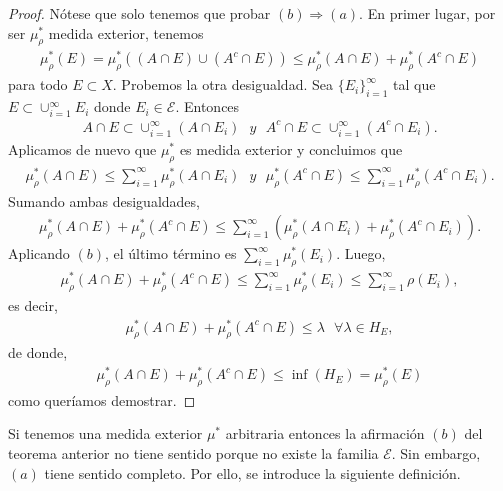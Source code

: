 \begin{proof}
Nótese que solo tenemos que probar $(b) \Longrightarrow (a)$. En primer lugar, por ser $\mu_{\rho}^*$ medida exterior, tenemos
\begin{align*}
    \mu_{\rho}^*(E) = \mu_{\rho}^*((A \cap E) \cup (A^c \cap E)) \leq \mu_{\rho}^*(A \cap E) + \mu_{\rho}^*(A^c \cap E)
\end{align*}
para todo $E \subset X$. Probemos la otra desigualdad. Sea $\{E_i\}_{i=1}^{\infty}$ tal que $E \subset \cup_{i=1}^{\infty}{E_i}$ donde $E_i \in \mathcal{E}$. Entonces
\begin{align*}
    A \cap E \subset \cup_{i=1}^{\infty}{(A \cap E_i)} \ \ \ y \ \ \ A^c \cap E \subset \cup_{i=1}^{\infty}{(A^c \cap E_i)}.
\end{align*}
Aplicamos de nuevo que $\mu_{\rho}^*$ es medida exterior y concluimos que
\begin{align*}
    \mu_{\rho}^*(A \cap E) \leq \sum_{i=1}^{\infty}{ \mu_{\rho}^*(A \cap E_i)} \ \ \ y \ \ \ \mu_{\rho}^*(A^c \cap E) \leq \sum_{i=1}^{\infty}{ \mu_{\rho}^*(A^c \cap E_i)}.
\end{align*}
Sumando ambas desigualdades,
\begin{align*}
    \mu_{\rho}^*(A \cap E) + \mu_{\rho}^*(A^c \cap E) \leq \sum_{i=1}^{\infty}{( \mu_{\rho}^*(A \cap E_i) + \mu_{\rho}^*(A^c \cap E_i))}.
\end{align*}
Aplicando $(b)$, el último término es $\sum_{i=1}^{\infty}{\mu_{\rho}^*(E_i)}$. Luego,
\begin{align*}
    \mu_{\rho}^*(A \cap E) + \mu_{\rho}^*(A^c \cap E) \leq \sum_{i=1}^{\infty}{\mu_{\rho}^*(E_i)} \leq \sum_{i=1}^{\infty}{\rho(E_i)},
\end{align*}
es decir,
\begin{align*}
    \mu_{\rho}^*(A \cap E) + \mu_{\rho}^*(A^c \cap E) \leq \lambda \ \ \ \forall \lambda \in H_E,
\end{align*}
de donde,
\begin{align*}
    \mu_{\rho}^*(A \cap E) + \mu_{\rho}^*(A^c \cap E) \leq \inf(H_E) = \mu_{\rho}^*(E)
\end{align*}
como queríamos demostrar.
\end{proof}

\begin{obs}
Si tenemos una medida exterior $\mu^*$ arbitraria entonces la afirmación $(b)$ del teorema anterior no tiene sentido porque no existe la familia $\mathcal{E}$. Sin embargo, $(a)$ tiene sentido completo. Por ello, se introduce la siguiente definición.
\end{obs}


